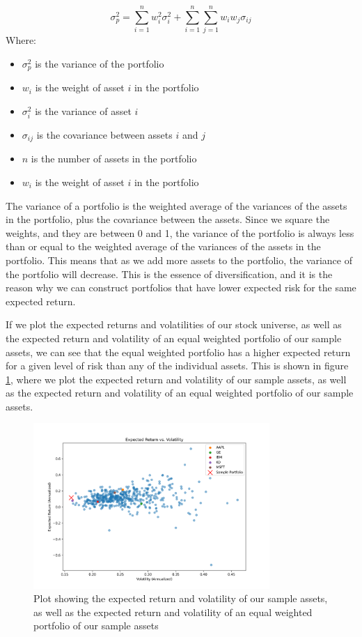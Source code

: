\begin{equation}
    \label{eq:portfolio_risk}
    \sigma_p^2 = \sum_{i=1}^n w_i^2 \sigma_i^2 + \sum_{i=1}^n \sum_{j=1}^n w_i w_j \sigma_{ij}
\end{equation}
Where:
\begin{itemize}
    \item $\sigma_p^2$ is the variance of the portfolio
    \item $w_i$ is the weight of asset $i$ in the portfolio
    \item $\sigma_i^2$ is the variance of asset $i$
    \item $\sigma_{ij}$ is the covariance between assets $i$ and $j$
    \item $n$ is the number of assets in the portfolio
    \item $w_i$ is the weight of asset $i$ in the portfolio
 \end{itemize}
The variance of a portfolio is the weighted average of the variances of the assets in the portfolio, plus the covariance between the assets.
Since we square the weights, and they are between 0 and 1, the variance of the portfolio is always less than or equal to the weighted average of the variances of the assets in the portfolio.
This means that as we add more assets to the portfolio, the variance of the portfolio will decrease.
This is the essence of diversification, and it is the reason why we can construct portfolios that have lower expected risk for the same expected return.

If we plot the expected returns and volatilities of our stock universe, as well as the expected return and volatility of an equal weighted 
portfolio of our sample assets, we can see that the equal weighted portfolio has a higher expected return for a given level of risk than any of the individual assets.
This is shown in figure \ref{fig:diversification}, where we plot the expected return and volatility of our sample assets, as well as the expected return and volatility of an equal weighted portfolio of our sample assets.
\begin{figure}
    \centering
    \includegraphics[width=0.8\textwidth]{../figs/expected_returns_vs_volatility.png}
    \caption{Plot showing the expected return and volatility of our sample assets, as well as the expected return and volatility of an equal weighted portfolio of our sample assets}
    \label{fig:diversification}
\end{figure}

